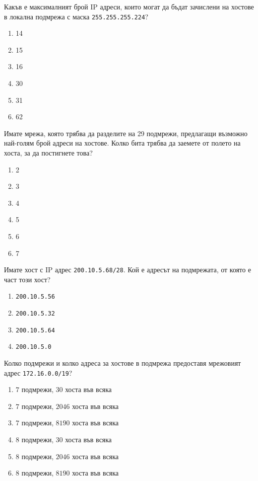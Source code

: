 \begin{q}
  Какъв е максималният брой IP адреси, които могат да бъдат зачислени на хостове
  в локална подмрежа с маска \texttt{255.255.255.224}?
  \begin{enumerate}
  \item 14
  \item 15
  \item 16
  \item 30
  \item 31
  \item 62
  \end{enumerate}
\end{q}

\begin{q}
  Имате мрежа, която трябва да разделите на 29 подмрежи, предлагащи възможно
  най-голям брой адреси на хостове. Колко бита трябва да заемете от полето на
  хоста, за да постигнете това?
  \begin{enumerate}
  \item 2
  \item 3
  \item 4
  \item 5
  \item 6
  \item 7
  \end{enumerate}
\end{q}

\begin{q}
  Имате хост с IP адрес \texttt{200.10.5.68/28}. Кой е адресът на подмрежата, от
  която е част този хост?
  \begin{enumerate}
  \item \texttt{200.10.5.56}
  \item \texttt{200.10.5.32}
  \item \texttt{200.10.5.64}
  \item \texttt{200.10.5.0}
  \end{enumerate}
\end{q}

\begin{q}
  Колко подмрежи и колко адреса за хостове в подмрежа предоставя мрежовият адрес
  \texttt{172.16.0.0/19}?
  \begin{enumerate}
  \item $7$ подмрежи, $30$ хоста във всяка
  \item $7$ подмрежи, $2046$ хоста във всяка
  \item $7$ подмрежи, $8190$ хоста във всяка
  \item $8$ подмрежи, $30$ хоста във всяка
  \item $8$ подмрежи, $2046$ хоста във всяка
  \item $8$ подмрежи, $8190$ хоста във всяка
  \end{enumerate}
\end{q}

